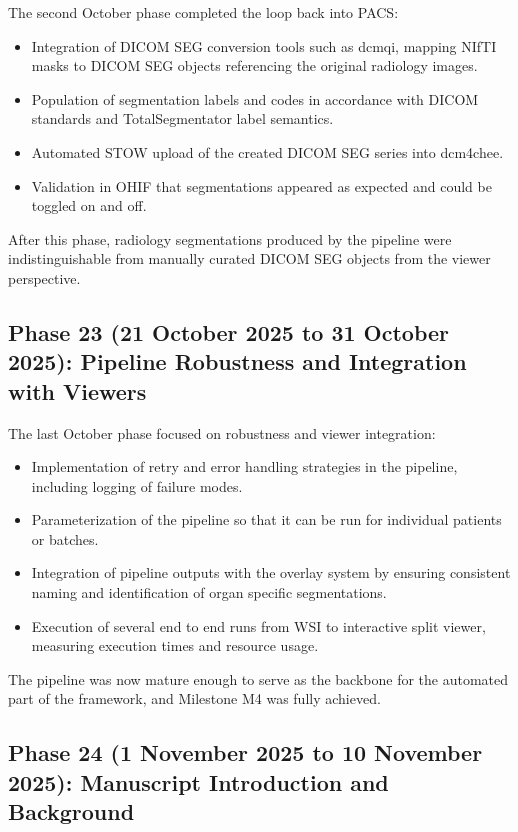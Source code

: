 \documentclass[11pt,a4paper]{article}
\begin{document}
The second October phase completed the loop back into PACS:

\begin{itemize}
    \item Integration of DICOM SEG conversion tools such as dcmqi, mapping NIfTI masks to DICOM SEG objects referencing the original radiology images.
    \item Population of segmentation labels and codes in accordance with DICOM standards and TotalSegmentator label semantics.
    \item Automated STOW upload of the created DICOM SEG series into dcm4chee.
    \item Validation in OHIF that segmentations appeared as expected and could be toggled on and off.
\end{itemize}

After this phase, radiology segmentations produced by the pipeline were indistinguishable from manually curated DICOM SEG objects from the viewer perspective.

\subsection*{Phase 23 (21 October 2025 to 31 October 2025): Pipeline Robustness and Integration with Viewers}

The last October phase focused on robustness and viewer integration:

\begin{itemize}
    \item Implementation of retry and error handling strategies in the pipeline, including logging of failure modes.
    \item Parameterization of the pipeline so that it can be run for individual patients or batches.
    \item Integration of pipeline outputs with the overlay system by ensuring consistent naming and identification of organ specific segmentations.
    \item Execution of several end to end runs from WSI to interactive split viewer, measuring execution times and resource usage.
\end{itemize}

The pipeline was now mature enough to serve as the backbone for the automated part of the framework, and Milestone M4 was fully achieved.

\subsection*{Phase 24 (1 November 2025 to 10 November 2025): Manuscript Introduction and Background}
\end{document}
